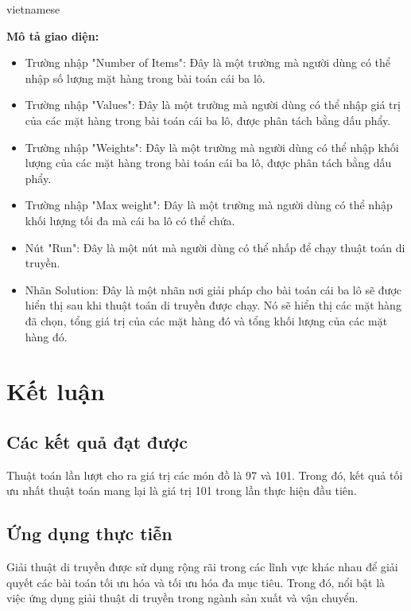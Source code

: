 \documentclass[a4paper]{article}
\begin{document}
\begin{otherlanguage*}{vietnamese}
\begin{enumerate}[leftmargin=7pt]
\textbf{Mô tả giao diện:}

\begin{itemize}
\setlength\itemindent{-9pt}
\item
Trường nhập "Number of Items": Đây là một trường mà người dùng có thể nhập số lượng mặt hàng trong bài toán cái ba lô.

\item
Trường nhập "Values": Đây là một trường mà người dùng có thể nhập giá trị của các mặt hàng trong bài toán cái ba lô, được phân tách bằng dấu phẩy.

\item
Trường nhập "Weights": Đây là một trường mà người dùng có thể nhập khối lượng của các mặt hàng trong bài toán cái ba lô, được phân tách bằng dấu phẩy.

\item
Trường nhập "Max weight": Đây là một trường mà người dùng có thể nhập khối lượng tối đa mà cái ba lô có thể chứa.

\item
Nút "Run": Đây là một nút mà người dùng có thể nhấp để chạy thuật toán di truyền.

\item
Nhãn Solution: Đây là một nhãn nơi giải pháp cho bài toán cái ba lô sẽ được hiển thị sau khi thuật toán di truyền được chạy. Nó sẽ hiển thị các mặt hàng đã chọn, tổng giá trị của các mặt hàng đó và tổng khối lượng của các mặt hàng đó. 
\end{itemize}

\section{Kết luận}
\subsection{Các kết quả đạt được}

Thuật toán lần lượt cho ra giá trị các món đồ là 97 và 101. Trong đó, kết quả tối ưu nhất thuật toán mang lại là giá trị 101 trong lần thực hiện đầu tiên.

\subsection{Ứng dụng thực tiễn}

Giải thuật di truyền được sử dụng rộng rãi trong các lĩnh vực khác nhau để giải quyết các bài toán tối ưu hóa và tối ưu hóa đa mục tiêu. Trong đó, nổi bật là việc ứng dụng giải thuật di truyền trong ngành sản xuất và vận chuyển.


\end{enumerate}
\end{otherlanguage*}
\end{document}
